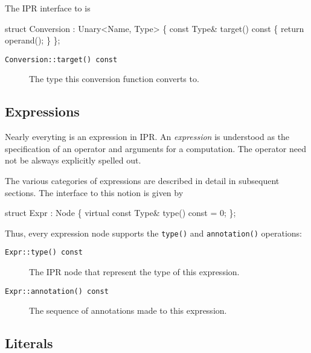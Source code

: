 \documentclass[a4paper,12pt]{article}
\begin{document}
The IPR interface to  is
\begin{Program}
   struct Conversion : Unary<Name, Type> \{
      const Type& target() const \{ return operand(); \}
   \};
\end{Program}
\begin{description}
\item[\texttt{Conversion::target() const}] The type this conversion function
  converts to. 
\end{description}

\subsection{Expressions}

Nearly everyting is an expression in IPR.  An \emph{expression} is understood
as the specification of an operator and arguments for a computation.  The
operator need not be alsways explicitly spelled out.

The various categories of expressions are described in detail in subsequent
sections.  The interface to this notion is given by
\begin{Program}
   struct Expr : Node \{
      virtual const Type& type() const = 0;
   \};
\end{Program}
Thus, every expression node supports the \texttt{type()} and
\texttt{annotation()} operations:
\begin{description}
\item[\texttt{Expr::type() const}] The IPR node that represent the type of
  this expression.
\item[\texttt{Expr::annotation() const}] The sequence of annotations made to
  this expression.
\end{description}



\subsection{Literals}


\end{document}
